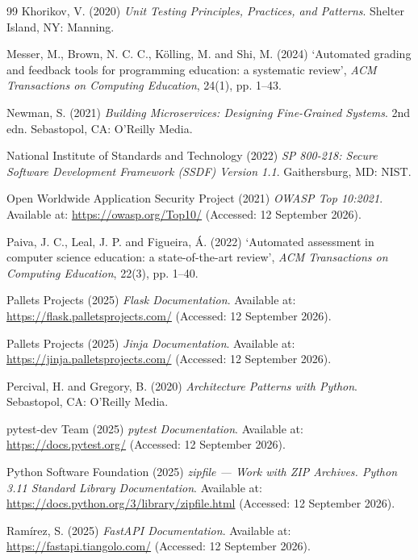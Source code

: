 \documentclass[a4paper,11pt]{article}
\begin{document}
\begin{thebibliography}{99}
Khorikov, V. (2020) \textit{Unit Testing Principles, Practices, and Patterns}.
Shelter Island, NY: Manning.

Messer, M., Brown, N. C. C., K\"{o}lling, M. and Shi, M. (2024) `Automated
grading and feedback tools for programming education: a systematic review',
\textit{ACM Transactions on Computing Education}, 24(1), pp. 1--43.

Newman, S. (2021) \textit{Building Microservices: Designing Fine-Grained
Systems}. 2nd edn. Sebastopol, CA: O'Reilly Media.

National Institute of Standards and Technology (2022) \textit{SP 800-218:
Secure Software Development Framework (SSDF) Version 1.1}. Gaithersburg, MD:
NIST.

Open Worldwide Application Security Project (2021) \textit{OWASP Top 10:2021}.
Available at: \url{https://owasp.org/Top10/} (Accessed: 12 September 2026).

Paiva, J. C., Leal, J. P. and Figueira, \'{A}. (2022) `Automated assessment in
computer science education: a state-of-the-art review', \textit{ACM
Transactions on Computing Education}, 22(3), pp. 1--40.

Pallets Projects (2025) \textit{Flask Documentation}. Available at:
\url{https://flask.palletsprojects.com/} (Accessed: 12 September 2026).

Pallets Projects (2025) \textit{Jinja Documentation}. Available at:
\url{https://jinja.palletsprojects.com/} (Accessed: 12 September 2026).

Percival, H. and Gregory, B. (2020) \textit{Architecture Patterns with Python}.
Sebastopol, CA: O'Reilly Media.

pytest-dev Team (2025) \textit{pytest Documentation}. Available at:
\url{https://docs.pytest.org/} (Accessed: 12 September 2026).

Python Software Foundation (2025) \textit{zipfile --- Work with ZIP Archives.
Python 3.11 Standard Library Documentation}. Available at:
\url{https://docs.python.org/3/library/zipfile.html} (Accessed:
12 September 2026).

Ram\'{i}rez, S. (2025) \textit{FastAPI Documentation}. Available at:
\url{https://fastapi.tiangolo.com/} (Accessed: 12 September 2026).


\end{thebibliography}
\end{document}
